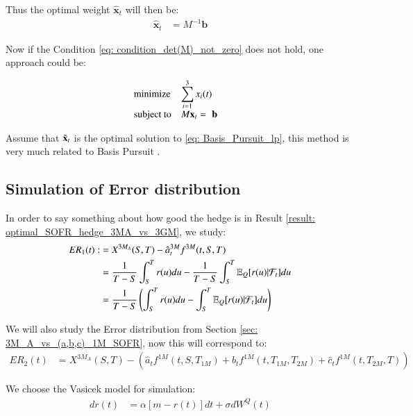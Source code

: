 Thus the optimal weight $\hat{\mathbf{x}}_{t}$ will then be:   
\begin{align*}
\hat{\mathbf{x}}_{t} &= 
M^{-1}\mathbf{b}
\end{align*}


Now if the Condition \ref{eq: condition_det(M)_not_zero} does not hold, one approach could be:

\begin{align}
\label{eq: Basis_Pursuit_lp}
\begin{array}{ll@{}ll}
\text{minimize}  & \displaystyle\sum\limits_{i=1}^{3}x_{i}(t)&  &\\
\text{subject to}& \displaystyle   M\mathbf{x}_{t} = & \mathbf{b}
\end{array}    
\end{align}

Assume that $\Tilde{\mathbf{x}}_{t}$ is the optimal solution to \ref{eq: Basis_Pursuit_lp}, this method is
very much related to Basis Pursuit \cite{chen1998atomic}.



\newpage 

\subsection{Simulation of Error distribution}

In order to say something about how good the hedge is in Result \ref{result: optimal_SOFR_hedge_3MA_vs_3GM}, we study: 
\begin{align*}
ER_{1}(t) :&= X^{3M_{A}}(S,T) - \hat{a}_{t}^{3M}f^{3M}(t,S,T) \\ 
&= \frac{1}{T-S}\int_{S}^{T}r(u)du - \frac{1}{T-S}\int_{S}^{T}\mathbb{E}_{Q}[r(u)|\mathcal{F}_{t}]du \\ 
&= 
\frac{1}{T-S}\left(
\int_{S}^{T}r(u)du - \int_{S}^{T}\mathbb{E}_{Q}[r(u)|\mathcal{F}_{t}]du
\right)
\end{align*}

We will also study the Error distribution from Section \ref{sec: 3M_A_vs_(a,b,c)_1M_SOFR}, now this will correspond to: 
\begin{align*}
ER_{2}(t) &= 
X^{3M_{A}}(S,T) - \left(
\hat{a}_{t}f^{1M}(t,S,T_{1M}) + 
\hat{b}_{t}f^{1M}(t,T_{1M}, T_{2M}) + 
\hat{c}_{t}f^{1M}(t,T_{2M}, T)
\right)
\end{align*}


We choose the Vasicek model for simulation:
\begin{align*}
dr(t) &= \alpha[m-r(t)]dt + \sigma dW^{Q}(t)    
\end{align*}

